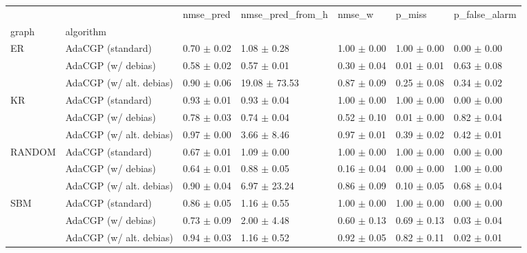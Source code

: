 \begin{tabular}{lllllll}
\toprule
    &                         &        nmse_pred &   nmse_pred_from_h &           nmse_w &           p_miss &    p_false_alarm \\
graph & algorithm &                  &                    &                  &                  &                  \\
\midrule
ER & AdaCGP (standard) &  0.70 $\pm$ 0.02 &    1.08 $\pm$ 0.28 &  1.00 $\pm$ 0.00 &  1.00 $\pm$ 0.00 &  0.00 $\pm$ 0.00 \\
    & AdaCGP (w/ debias) &  0.58 $\pm$ 0.02 &    0.57 $\pm$ 0.01 &  0.30 $\pm$ 0.04 &  0.01 $\pm$ 0.01 &  0.63 $\pm$ 0.08 \\
    & AdaCGP (w/ alt. debias) &  0.90 $\pm$ 0.06 &  19.08 $\pm$ 73.53 &  0.87 $\pm$ 0.09 &  0.25 $\pm$ 0.08 &  0.34 $\pm$ 0.02 \\
KR & AdaCGP (standard) &  0.93 $\pm$ 0.01 &    0.93 $\pm$ 0.04 &  1.00 $\pm$ 0.00 &  1.00 $\pm$ 0.00 &  0.00 $\pm$ 0.00 \\
    & AdaCGP (w/ debias) &  0.78 $\pm$ 0.03 &    0.74 $\pm$ 0.04 &  0.52 $\pm$ 0.10 &  0.01 $\pm$ 0.00 &  0.82 $\pm$ 0.04 \\
    & AdaCGP (w/ alt. debias) &  0.97 $\pm$ 0.00 &    3.66 $\pm$ 8.46 &  0.97 $\pm$ 0.01 &  0.39 $\pm$ 0.02 &  0.42 $\pm$ 0.01 \\
RANDOM & AdaCGP (standard) &  0.67 $\pm$ 0.01 &    1.09 $\pm$ 0.00 &  1.00 $\pm$ 0.00 &  1.00 $\pm$ 0.00 &  0.00 $\pm$ 0.00 \\
    & AdaCGP (w/ debias) &  0.64 $\pm$ 0.01 &    0.88 $\pm$ 0.05 &  0.16 $\pm$ 0.04 &  0.00 $\pm$ 0.00 &  1.00 $\pm$ 0.00 \\
    & AdaCGP (w/ alt. debias) &  0.90 $\pm$ 0.04 &   6.97 $\pm$ 23.24 &  0.86 $\pm$ 0.09 &  0.10 $\pm$ 0.05 &  0.68 $\pm$ 0.04 \\
SBM & AdaCGP (standard) &  0.86 $\pm$ 0.05 &    1.16 $\pm$ 0.55 &  1.00 $\pm$ 0.00 &  1.00 $\pm$ 0.00 &  0.00 $\pm$ 0.00 \\
    & AdaCGP (w/ debias) &  0.73 $\pm$ 0.09 &    2.00 $\pm$ 4.48 &  0.60 $\pm$ 0.13 &  0.69 $\pm$ 0.13 &  0.03 $\pm$ 0.04 \\
    & AdaCGP (w/ alt. debias) &  0.94 $\pm$ 0.03 &    1.16 $\pm$ 0.52 &  0.92 $\pm$ 0.05 &  0.82 $\pm$ 0.11 &  0.02 $\pm$ 0.01 \\
\bottomrule
\end{tabular}
